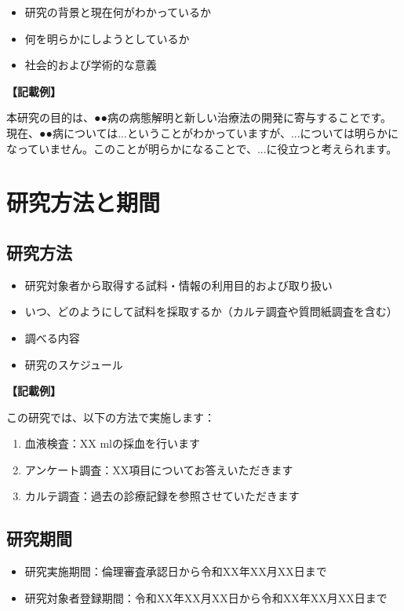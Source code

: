 \documentclass[a4paper,11pt,lualatex,ja=standard]{bxjsarticle}
\begin{document}
\begin{itemize}
\item 研究の背景と現在何がわかっているか
\item 何を明らかにしようとしているか
\item 社会的および学術的な意義
\end{itemize}

\textbf{【記載例】}

本研究の目的は、●●病の病態解明と新しい治療法の開発に寄与することです。現在、●●病については...ということがわかっていますが、...については明らかになっていません。このことが明らかになることで、...に役立つと考えられます。

\section{研究方法と期間}

\subsection{研究方法}

\begin{itemize}
\item 研究対象者から取得する試料・情報の利用目的および取り扱い
\item いつ、どのようにして試料を採取するか（カルテ調査や質問紙調査を含む）
\item 調べる内容
\item 研究のスケジュール
\end{itemize}

\textbf{【記載例】}

この研究では、以下の方法で実施します：

\begin{enumerate}
\item 血液検査：XX mlの採血を行います
\item アンケート調査：XX項目についてお答えいただきます
\item カルテ調査：過去の診療記録を参照させていただきます
\end{enumerate}

\subsection{研究期間}

\begin{itemize}
\item 研究実施期間：倫理審査承認日から令和XX年XX月XX日まで
\item 研究対象者登録期間：令和XX年XX月XX日から令和XX年XX月XX日まで
\end{itemize}
\end{document}
